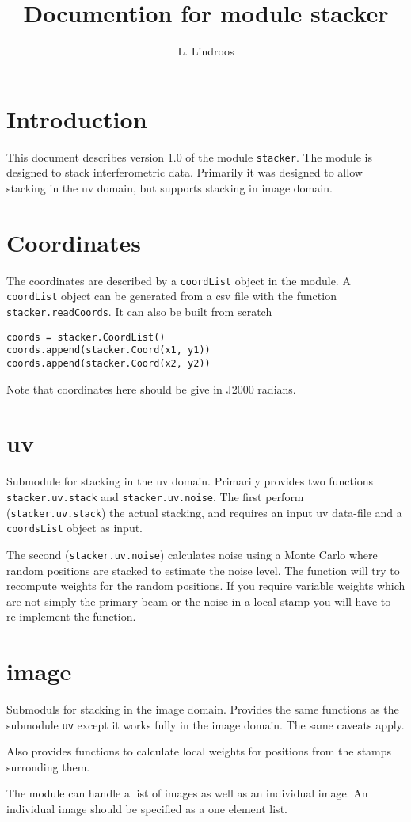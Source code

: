 \documentclass{article}
\title{Documention for module stacker}
\author{L. Lindroos}
\begin{document}
\maketitle

\section{Introduction}
This document describes version 1.0 of the module {\tt stacker}.
The module is designed to stack interferometric data.
Primarily it was designed to allow stacking in the uv domain, 
but supports stacking in image domain.

\section{Coordinates}
The coordinates are described by a {\tt coordList} object in the module.
A {\tt coordList} object can be generated from a csv file with the function {\tt stacker.readCoords}.
It can also be built from scratch
\begin{verbatim}
coords = stacker.CoordList()
coords.append(stacker.Coord(x1, y1))
coords.append(stacker.Coord(x2, y2))
\end{verbatim}
Note that coordinates here should be give in J2000 radians.

\section{uv}
Submodule for stacking in the uv domain. 
Primarily provides two functions {\tt stacker.uv.stack} and {\tt stacker.uv.noise}.
The first perform ({\tt stacker.uv.stack}) the actual stacking, 
and requires an input uv data-file and a {\tt coordsList} object as input.

The second ({\tt stacker.uv.noise}) calculates noise using a Monte Carlo
where random positions are stacked to estimate the noise level. 
The function will try to recompute weights for the random positions.
If you require variable weights which are not simply the primary beam
or the noise in a local stamp you will have to re-implement the function.

\section{image}
Submoduls for stacking in the image domain.
Provides the same functions as the submodule {\tt uv} except it works fully in the image domain.
The same caveats apply. 

Also provides functions to calculate local weights for positions from the stamps surronding them.

The module can handle a list of images as well as an individual image.
An individual image should be specified as a one element list.
\end{document}
